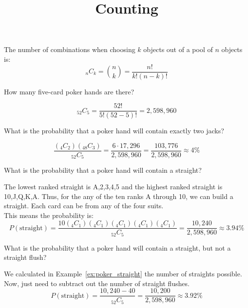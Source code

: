 \documentclass{beamer}
\title[MA205 - Section 4.3]{Counting}
\newcommand{\prob}[1]{P\left(#1\right)}
\newcommand{\comb}[2]{_{#1}C_{#2}}
\begin{document}
\begin{frame}
\titlepage
\end{frame}

\begin{frame}
\begin{definition}
The number of combinations when choosing $k$ objects out of a pool of $n$ objects is:
\begin{equation*}
\comb{n}{k}=\binom{n}{k} = \dfrac{n!}{k!\left(n-k\right)!}
\end{equation*}
\end{definition}\pause

\begin{example}
How many five-card poker hands are there?\pause

\begin{equation*}
\comb{52}{5} = \dfrac{52!}{5!\left(52-5\right)!} = 2,598,960
\end{equation*}
\end{example}\pause

\begin{example}\label{ex:poker_straight}
What is the probability that a poker hand will contain exactly two jacks?\pause

\begin{equation*}
\dfrac{\left(\comb{4}{2}\right)\left(\comb{48}{3}\right)}{\comb{52}{5}} = \dfrac{6\cdot17,296}{2,598,960} = \dfrac{103,776}{2,598,960} \approx 4\%
\end{equation*}
\end{example}
\end{frame}

\begin{frame}
\begin{example}
What is the probability that a poker hand will contain a straight?\pause

\vspace{2mm}
The lowest ranked straight is A,2,3,4,5 and the highest ranked straight is 10,J,Q,K,A. Thus, for the any of the ten ranks A through 10, we can build a straight. Each card can be from any of the four suits.\\ This means the probability is:
\begin{equation*}
\prob{\text{straight}} = \dfrac{10\left(\comb{4}{1}\right)\left(\comb{4}{1}\right)\left(\comb{4}{1}\right)\left(\comb{4}{1}\right)\left(\comb{4}{1}\right)}{\comb{52}{5}} = \dfrac{10,240}{2,598,960} \approx 3.94\%
\end{equation*}
\end{example}\pause

\begin{example}
What is the probability that a poker hand will contain a straight, but not a straight flush?\pause

We calculated in Example~\ref{ex:poker_straight} the number of straights possible. Now, just need to subtract out the number of straight flushes.
\begin{equation*}
\prob{\text{straight}} = \dfrac{10,240 - 40}{\comb{52}{5}} = \dfrac{10,200}{2,598,960} \approx 3.92\%
\end{equation*}

\end{example}
\end{frame}
\end{document}
